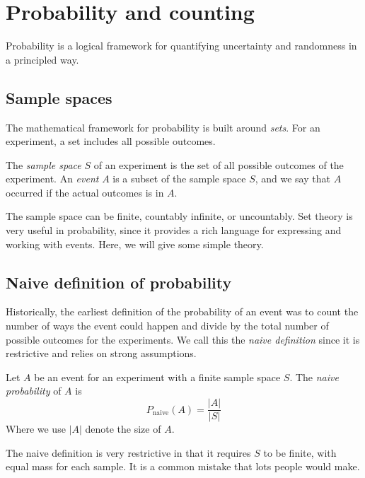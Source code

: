 \section{Probability and counting}

Probability is a logical framework for quantifying uncertainty and randomness in a principled way. 

\subsection{Sample spaces}

The mathematical framework for probability is built around \textit{sets}. For an experiment, a set includes all possible outcomes.

\begin{defn}
    The \textit{sample space} $S$ of an experiment is the set of all possible outcomes of the experiment. An \textit{event} $A$ is a subset of the sample space $S$, and we say that $A$ occurred if the actual outcomes is in $A$.
\end{defn}

The sample space can be finite, countably infinite, or uncountably. Set theory is very useful in probability, since it provides a rich language for expressing and working with events. Here, we will give some simple theory.

\subsection{Naive definition of probability}

Historically, the earliest definition of the probability of an event was to count the number of ways the event could happen and divide by the total number of possible outcomes for the experiments. We call this the \textit{naive definition} since it is restrictive and relies on strong assumptions.

\begin{defn}
    Let $A$ be an event for an experiment with a finite sample space $S$. The \textit{naive probability} of $A$ is 
    $$
    P_{\text{naive}}(A) = \frac{|A|}{|S|}
    $$
    Where we use $|A|$ denote the size of $A$.
\end{defn}

The naive definition is very restrictive in that it requires $S$ to be finite, with equal mass for each sample. It is a common mistake that lots people would make.

